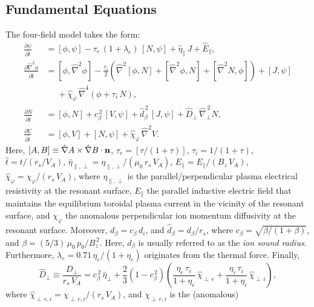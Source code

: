 \documentclass[12pt,prb,aps]{revtex4-1}
\begin{document}
\subsection{Fundamental Equations}
The four-field model takes the form:\cite{fw}
\begin{align}
\frac{\partial\psi}{\partial\hat{t}}&= [\phi,\psi] -\tau_e\,(1+\lambda_e)\,[N,\psi]
+\hat{\eta}_\parallel\,J + \hat{E}_\parallel,\\[0.5ex]
\frac{\partial \hat{\nabla}^2\phi}{\partial \hat{t}}&= [\phi,\hat{\nabla}^2\phi] - \frac{\tau_i}{2}\left(\hat{\nabla}^2[\phi,N] + [\hat{\nabla}^2\phi,N] + [\hat{\nabla}^2 N,\phi]\right) + [J,\psi] \nonumber\\[0.5ex]&\phantom{=}+\hat{\chi}_\varphi  \,\hat{\nabla}^4\!\left(\phi + \tau_i\,N\right), \\[0.5ex]
\frac{\partial N}{\partial \hat{t}}&= [\phi,N] +c_\beta^{\,2}\,[V,\psi] +\hat{d}_\beta^{\,2}\,[J,\psi]
+ \hat{D}_\perp\,\hat{\nabla}_\perp^{\,2}N,\\[0.5ex]
\frac{\partial V}{\partial\hat{t}}&= [\phi,V] +[N,\psi] + \hat{\chi}_\varphi\,\hat{\nabla}^2 V.\label{e21}
\end{align}
Here, $[A,B]\equiv \hat{\nabla} A\times \hat{\nabla} B\cdot {\bf n}$, $\tau_e=[\tau/(1+\tau)]$, $\tau_i=1/(1+\tau)$, $\hat{t} = t/(r_s/V_A)$, $\hat{\eta}_{\parallel,\perp} = \eta_{\parallel,\perp}/(\mu_0\,r_s\,V_A)$, $\hat{E}_\parallel = E_\parallel/(B_z\,V_A)$, 
$\hat{\chi}_\varphi= \chi_\varphi/(r_s\,V_A)$, where $\eta_{\parallel,\perp}$ is the parallel/perpendicular plasma electrical
resistivity at the resonant surface, $E_\parallel$ the parallel inductive electric field that maintains the equilibrium toroidal
plasma current in the vicinity of the resonant surface, and $\chi_\varphi$  the anomalous perpendicular ion momentum
diffusivity at the resonant surface. 
Moreover, $d_\beta=c_\beta\,d_i$, and $\hat{d}_\beta=d_\beta/r_s$, where $c_\beta = \sqrt{\beta/(1+\beta)}$, and
$\beta=(5/3)\,\mu_0\,p_0/B_z^{\,2}$. Here, $d_\beta$ is usually referred to as the {\em ion sound radius}. Furthermore,
$\lambda_e=0.71\,\eta_e/(1+\eta_e)$ originates from the thermal force. Finally,\cite{fw}
\begin{equation}
\hat{D}_\perp \equiv \frac{D_{\perp}}{r_s\,V_A}= c_\beta^{\,2}\,\hat{\eta}_\perp +  \frac{2}{3}\left(1-c_\beta^{\,2}\right)\!\left(\frac{\eta_e\,\tau_e}{1+\eta_e}\,\hat{\chi}_{\perp\,e} + \frac{\eta_i\,\tau_i}{1+\eta_i}\,\hat{\chi}_{\perp\,i}\right),
\end{equation}
where $\hat{\chi}_{\perp\,e,i}=\chi_{\perp\,e,i}/(r_s\,V_A)$, and $\chi_{\perp\,e,i}$ is the (anomalous)
\end{document}
